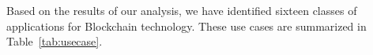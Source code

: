 Based on the results of our analysis, we have identified sixteen classes of applications for Blockchain technology.
These use cases are summarized in Table~\ref{tab:usecase}.

%
%
%	
%	
%	
%	
%	
%	
%	
%	
%	
%	
%	
%	
